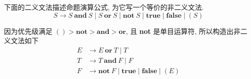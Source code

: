 \documentclass[boxes]{homework}
\begin{document}
\begin{problem}
下面的二义文法描述命题演算公式, 为它写一个等价的非二义文法.
\begin{equation}
    S \to S\ \mathbf{and}\ S \mid S\ \mathbf{or}\ S \mid \mathbf{not}\ S \mid
    \mathbf{true} \mid  \mathbf{false} \mid (S)
\end{equation}
\end{problem}
\begin{solution}
    因为优先级满足 $() > \mathbf{not} > \mathbf{and} > \mathbf{or}$, 且
    \textbf{not} 是单目运算符, 所以构造出非二义文法如下
    \begin{equation}
        \begin{aligned}
            E & \to E\ \mathbf{or}\ T \mid T                               \\
            T & \to T\ \mathbf{and}\ F \mid F                              \\
            F & \to \mathbf{not}\ F \mid \mathbf{true} \mid \mathbf{false}
            \mid (E)
        \end{aligned}
    \end{equation}
\end{solution}
\end{document}
